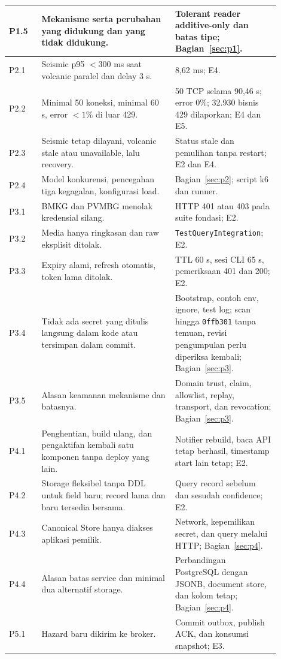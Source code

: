 \begin{longtable}{P{0.11\linewidth}P{0.45\linewidth}P{0.34\linewidth}}
P1.5 & Mekanisme serta perubahan yang didukung dan yang tidak didukung. & Tolerant reader additive-only dan batas tipe; Bagian~\ref{sec:p1}.\\
\midrule
P2.1 & Seismic p95 $<300$ ms saat volcanic paralel dan delay 3 s. & 8,62 ms; E4.\\
P2.2 & Minimal 50 koneksi, minimal 60 s, error $<1\%$ di luar 429. & 50 TCP selama 90,46 s; error 0\%; 32.930 bisnis 429 dilaporkan; E4 dan E5.\\
P2.3 & Seismic tetap dilayani, volcanic stale atau unavailable, lalu recovery. & Status stale dan pemulihan tanpa restart; E2 dan E4.\\
P2.4 & Model konkurensi, pencegahan tiga kegagalan, konfigurasi load. & Bagian~\ref{sec:p2}; script k6 dan runner.\\
\midrule
P3.1 & BMKG dan PVMBG menolak kredensial silang. & HTTP 401 atau 403 pada suite fondasi; E2.\\
P3.2 & Media hanya ringkasan dan raw eksplisit ditolak. & \texttt{TestQueryIntegration}; E2.\\
P3.3 & Expiry alami, refresh otomatis, token lama ditolak. & TTL 60 s, sesi CLI 65 s, pemeriksaan 401 dan 200; E2.\\
P3.4 & Tidak ada secret yang ditulis langsung dalam kode atau tersimpan dalam commit. & Bootstrap, contoh env, ignore, test log; scan hingga \texttt{0ffb301} tanpa temuan, revisi pengumpulan perlu diperiksa kembali; Bagian~\ref{sec:p3}.\\
P3.5 & Alasan keamanan mekanisme dan batasnya. & Domain trust, claim, allowlist, replay, transport, dan revocation; Bagian~\ref{sec:p3}.\\
\midrule
P4.1 & Penghentian, build ulang, dan pengaktifan kembali satu komponen tanpa deploy yang lain. & Notifier rebuild, baca API tetap berhasil, timestamp start lain tetap; E2.\\
P4.2 & Storage fleksibel tanpa DDL untuk field baru; record lama dan baru tersedia bersama. & Query record sebelum dan sesudah confidence; E2.\\
P4.3 & Canonical Store hanya diakses aplikasi pemilik. & Network, kepemilikan secret, dan query melalui HTTP; Bagian~\ref{sec:p4}.\\
P4.4 & Alasan batas service dan minimal dua alternatif storage. & Perbandingan PostgreSQL dengan JSONB, document store, dan kolom tetap; Bagian~\ref{sec:p4}.\\
\midrule
P5.1 & Hazard baru dikirim ke broker. & Commit outbox, publish ACK, dan konsumsi snapshot; E3.\\

\end{longtable}
